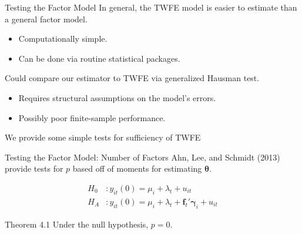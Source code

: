\documentclass{beamer}
\newcommand{\1}{\mathds{1}} %
\begin{document}

    



\begin{frame}{Testing the Factor Model}
    In general, the TWFE model is easier to estimate than a general factor model.
    \begin{itemize}
        \item Computationally simple. 
        \item Can be done via routine statistical packages. 
    \end{itemize}

    \vspace{.5 cm}

    Could compare our estimator to TWFE via generalized Hausman test.
    \begin{itemize}
        \item Requires structural assumptions on the model's errors.
        \item Possibly poor finite-sample performance. 
    \end{itemize}

    \vspace{.5 cm}

    We provide some simple tests for sufficiency of TWFE
\end{frame}


\begin{frame}{Testing the Factor Model: Number of Factors}
    Ahn, Lee, and Schmidt (2013) provide tests for $p$ based off of moments for estimating $\bm \theta$. 

    \begin{align*}
        H_0&: y_{it}(0) = \mu_i + \lambda_t + u_{it} \\
        H_A&: y_{it}(0) = \mu_i + \lambda_t + \bm f_t' \bm \gamma_i + u_{it} 
    \end{align*}

    \begin{block}{Theorem 4.1}
        Under the null hypothesis, $p = 0$. 
    \end{block}
\end{frame}
\end{document}
